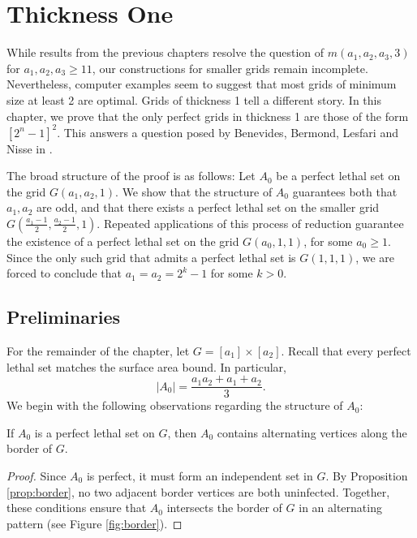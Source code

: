 \chapter{Thickness One}

While results from the previous chapters resolve the question of $m(a_1,a_2,a_3,3)$ for $a_1, a_2 , a_3 \geq 11$, our constructions for smaller grids remain incomplete. Nevertheless, computer examples seem to suggest that most grids of minimum size at least 2 are optimal. Grids of thickness 1 tell a different story. In this chapter, we prove that the only perfect grids in thickness 1 are those of the form $[2^n-1]^2$. This answers a question posed by Benevides, Bermond, Lesfari and Nisse in \cite{benevides:2021}.

The broad structure of the proof is as follows: Let $A_0$ be a perfect lethal set on the grid $G(a_1, a_2, 1)$. We show that the structure of $A_0$ guarantees both that $a_1,a_2$ are odd, and that there exists a perfect lethal set on the smaller grid $G(\frac{a_1-1}{2}, \frac{a_2-1}{2}, 1)$. Repeated applications of this process of reduction guarantee the existence of a perfect lethal set on the grid $G(a_0, 1,1)$, for some $a_0 \ge 1$. Since the only such grid that admits a perfect lethal set is $G(1,1,1)$, we are forced to conclude that $a_1 = a_2 = 2^k-1$ for some $k > 0$. 

\section{Preliminaries}
For the remainder of the chapter, let $G = [a_1] \times [a_2]$. Recall that every perfect lethal set matches the surface area bound. In particular,
$$|A_0| = \frac{a_1a_2 + a_1 + a_2}{3}.$$
We begin with the following observations regarding the structure of $A_0$:

\begin{prop}
\label{prop:alternating_border}
If $A_0$ is a perfect lethal set on $G$, then $A_0$ contains alternating vertices along the border of $G$. 
\end{prop}

\begin{proof}
Since $A_0$ is perfect, it must form an independent set in $G$. By Proposition \ref{prop:border}, no two adjacent border vertices are both uninfected. Together, these conditions ensure that $A_0$ intersects the border of $G$ in an alternating pattern (see Figure \ref{fig:border}). 
\end{proof}

